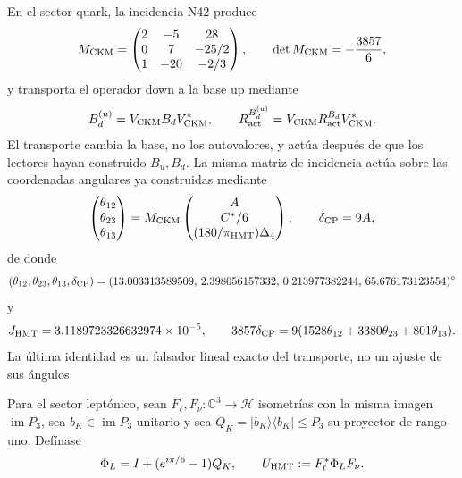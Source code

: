 En el sector quark, la incidencia N42 produce
\begin{equation}
 M_{\rm CKM}=
 \begin{pmatrix}
 2&-5&28\\
 0&7&-25/2\\
 1&-20&-2/3
 \end{pmatrix},
 \qquad \det M_{\rm CKM}=-\frac{3857}{6},
 \label{10j-eq-matriz-ckm}
\end{equation}
y transporta el operador down a la base up mediante
\begin{equation}
 B_d^{(u)}=V_{\rm CKM}B_dV_{\rm CKM}^*,
 \qquad
 R_{\rm act}^{B_d^{(u)}}
 =V_{\rm CKM}R_{\rm act}^{B_d}V_{\rm CKM}^*.
 \label{10j-eq-transporte-ckm}
\end{equation}
El transporte cambia la base, no los autovalores, y actúa después de que los
lectores hayan construido \(B_u,B_d\).
La misma matriz de incidencia actúa sobre las coordenadas angulares ya
construidas mediante
\begin{equation}
 \begin{pmatrix}\theta_{12}\\\theta_{23}\\\theta_{13}\end{pmatrix}
 =M_{\rm CKM}
 \begin{pmatrix}
  A\\ C^*/6\\ (180/\pi_{\rm HMT})\Delta_4
 \end{pmatrix},
 \qquad \delta_{\rm CP}=9A,
 \label{10j-eq-angulos-ckm}
\end{equation}
de donde
\begin{equation}
 (\theta_{12},\theta_{23},\theta_{13},\delta_{\rm CP})
 =(13.003313589509,\,2.398056157332,\,0.213977382244,
 \,65.676173123554)^\circ
 \label{10j-eq-salida-ckm}
\end{equation}
y
\begin{equation}
 J_{\rm HMT}=3.1189723326632974\times10^{-5},\qquad
 3857\delta_{\rm CP}
 =9(1528\theta_{12}+3380\theta_{23}+801\theta_{13}).
 \label{10j-eq-falsador-ckm}
\end{equation}
La última identidad es un falsador lineal exacto del transporte, no un ajuste
de sus ángulos.

Para el sector leptónico, sean \(F_\ell,F_\nu:\mathbb C^3\to\mathcal H\)
isometrías con la misma imagen \(\operatorname{im}P_3\), sea
\(b_K\in\operatorname{im}P_3\) unitario y sea
\(Q_K=|b_K\rangle\langle b_K|\leq P_3\) su proyector de rango uno. Defínase
\begin{equation}
 \Phi_L=I+(e^{i\pi/6}-1)Q_K,
 \qquad U_{\rm HMT}:=F_\ell^*\Phi_LF_\nu.
 \label{10j-eq-unitaria-leptonica}
\end{equation}

